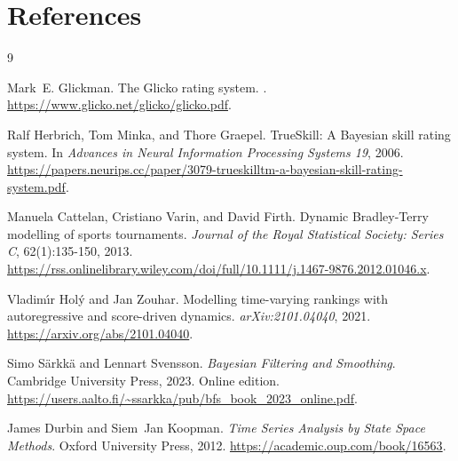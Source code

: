 \documentclass[11pt]{article}
\begin{document}
\section*{References}

\begin{thebibliography}{9}

Mark~E. Glickman.
\newblock The {G}licko rating system.
.
\newblock \url{https://www.glicko.net/glicko/glicko.pdf}.

Ralf Herbrich, Tom Minka, and Thore Graepel.
\newblock TrueSkill: A Bayesian skill rating system.
\newblock In \emph{Advances in Neural Information Processing Systems 19}, 2006.
\newblock \url{https://papers.neurips.cc/paper/3079-trueskilltm-a-bayesian-skill-rating-system.pdf}.

Manuela Cattelan, Cristiano Varin, and David Firth.
\newblock Dynamic Bradley-Terry modelling of sports tournaments.
\newblock \emph{Journal of the Royal Statistical Society: Series C}, 62(1):135-150, 2013.
\newblock \url{https://rss.onlinelibrary.wiley.com/doi/full/10.1111/j.1467-9876.2012.01046.x}.

Vladim\'{\i}r Hol\'y and Jan Zouhar.
\newblock Modelling time-varying rankings with autoregressive and score-driven dynamics.
\newblock \emph{arXiv:2101.04040}, 2021.
\newblock \url{https://arxiv.org/abs/2101.04040}.

Simo S\"arkk\"a and Lennart Svensson.
\newblock \emph{Bayesian Filtering and Smoothing}.
\newblock Cambridge University Press, 2023.
\newblock Online edition.
\newblock \url{https://users.aalto.fi/~ssarkka/pub/bfs_book_2023_online.pdf}.

James Durbin and Siem~Jan Koopman.
\newblock \emph{Time Series Analysis by State Space Methods}.
\newblock Oxford University Press, 2012.
\newblock \url{https://academic.oup.com/book/16563}.

\end{thebibliography}
\end{document}
